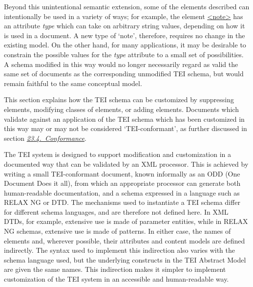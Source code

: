 Beyond this unintentional semantic extension, some of the elements described can intentionally be used in a variety of ways; for example, the element \hyperref[TEI.note]{<note>} has an attribute {\itshape type} which can take on arbitrary string values, depending on how it is used in a document. A new type of ‘note’, therefore, requires no change in the existing model. On the other hand, for many applications, it may be desirable to constrain the possible values for the {\itshape type} attribute to a small set of possibilities. A schema modified in this way would no longer necessarily regard as valid the same set of documents as the corresponding unmodified TEI schema, but would remain faithful to the same conceptual model.\par
This section explains how the TEI schema can be customized by suppressing elements, modifying classes of elements, or adding elements. Documents which validate against an application of the TEI schema which has been customized in this way may or may not be considered ‘TEI-conformant’, as further discussed in section \textit{\hyperref[CF]{23.4.\ Conformance}}.\par
The TEI system is designed to support modification and customization in a documented way that can be validated by an XML processor. This is achieved by writing a small TEI-conformant document, known informally as an ODD (One Document Does it all), from which an appropriate processor can generate both human-readable documentation, and a schema expressed in a language such as RELAX NG or DTD. The mechanisms used to instantiate a TEI schema differ for different schema languages, and are therefore not defined here. In XML DTDs, for example, extensive use is made of parameter entities, while in RELAX NG schemas, extensive use is made of patterns. In either case, the names of elements and, wherever possible, their attributes and content models are defined indirectly. The syntax used to implement this indirection also varies with the schema language used, but the underlying constructs in the TEI Abstract Model are given the same names.  This indirection makes it simpler to implement customization of the TEI system in an accessible and human-readable way.\par
